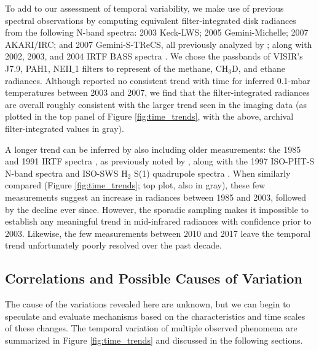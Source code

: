 \documentclass[twocolumn,10pt]{aastex631}
\begin{document}
To add to our assessment of temporal variability, we make use of previous spectral observations by computing equivalent filter-integrated disk radiances from the following N-band spectra: 2003 Keck-LWS; 2005 Gemini-Michelle; 2007 AKARI/IRC; and 2007 Gemini-S-TReCS, all previously analyzed by \citet{fletcher2014neptune}; along with 2002, 2003, and 2004 IRTF BASS spectra \citep{hammel2006mid}.  We chose the passbands of VISIR's J7.9, PAH1, NEII$\_$1 filters to represent of the methane, CH$_3$D, and ethane radiances.  Although \citet{fletcher2014neptune} reported no consistent trend with time for inferred 0.1-mbar temperatures between 2003 and 2007, we find that the filter-integrated radiances are overall roughly consistent with the larger trend seen in the imaging data (as plotted in the top panel of Figure \ref{fig:time_trends}, with the above, archival filter-integrated values in gray). 

A longer trend can be inferred by also including older measurements: the 1985 and 1991 IRTF spectra \citep{orton1987spectra,orton1992thermal}, as previously noted by \citet{hammel2006mid}, along with the 1997 ISO-PHT-S N-band spectra \citep{schulz1999detection} and ISO-SWS H$_2$ S(1) quadrupole spectra \citep{feuchtgruber1999detection}. When similarly compared (Figure \ref{fig:time_trends}; top plot, also in gray), these few measurements suggest an increase in radiances between 1985 and 2003, followed by the decline ever since. However, the sporadic sampling makes it impossible to establish any meaningful trend in mid-infrared radiances with confidence prior to 2003. Likewise, the few measurements between 2010 and 2017 leave the temporal trend unfortunately poorly resolved over the past decade. 

\subsection{Correlations and Possible Causes of Variation}
The cause of the variations revealed here are unknown, but we can begin to speculate and evaluate mechanisms based on the characteristics and time scales of these changes. The temporal variation of multiple observed phenomena are summarized in Figure \ref{fig:time_trends} and discussed in the following sections. \newline
\end{document}
